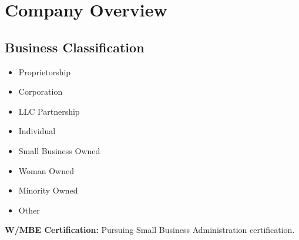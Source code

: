 \section{Company Overview}

\subsection{Business Classification}
\begin{itemize}
    \item[$\square$] Proprietorship
    \item[$\square$] Corporation
    \item[$\checkmark$] LLC Partnership
    \item[$\square$] Individual
    \item[$\checkmark$] Small Business Owned
    \item[$\checkmark$] Woman Owned
    \item[$\square$] Minority Owned
    \item[$\square$] Other
\end{itemize}


\textbf{W/MBE Certification:} Pursuing Small Business Administration certification.